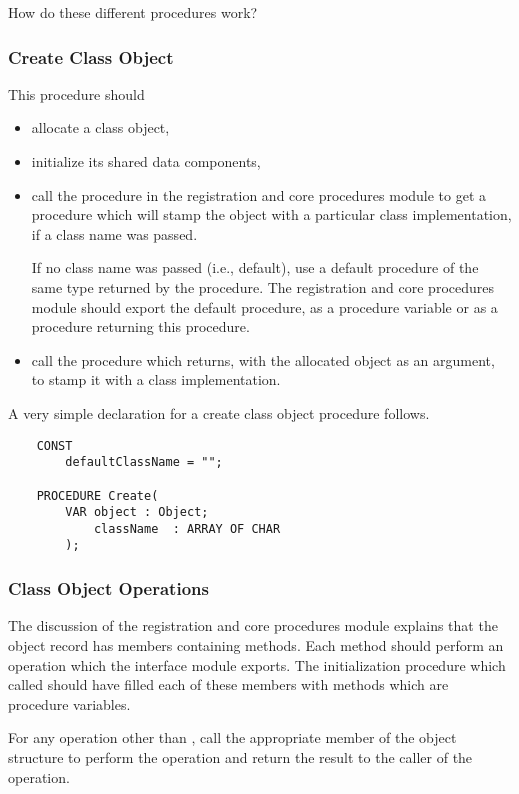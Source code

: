 How do these different procedures work?

\subsubsection{Create Class Object}

This procedure should
\begin{itemize}
\item
 allocate a class object,
\item
 initialize its shared data components, 
\item
 call the 
 procedure in the registration and core procedures module to get a procedure
 which will stamp the object with a particular class implementation, if a class
 name was passed.

 If no class name was passed (i.e., default), use a default procedure of the
 same type returned by the  procedure.  The registration and
 core procedures module should export the default procedure, as a procedure
 variable or as a procedure returning this procedure.
\item
 call the procedure which  returns, with the allocated object
 as an argument, to stamp it with a class implementation.
\end{itemize}

 A very simple declaration for a create class object
 procedure follows.
\begin{verbatim}
    CONST
        defaultClassName = "";

    PROCEDURE Create( 
	    VAR object : Object;
            className  : ARRAY OF CHAR 
        );
\end{verbatim}

\subsubsection{Class Object Operations}

The discussion of the registration and core procedures module explains that the
object record has members containing methods.  Each method should perform an
operation which the interface module exports.  The initialization procedure
which  called should have filled each of these members with
methods which are procedure variables.

For any operation other than , call the appropriate member
of the object structure to perform the operation and return the result to the
caller of the operation.

